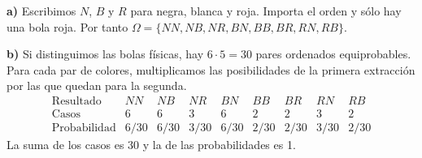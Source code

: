 \textbf{a)} Escribimos $N$, $B$ y $R$ para negra, blanca y roja.
Importa el orden y sólo hay una bola roja. Por tanto
$\Omega=\{NN,NB,NR,BN,BB,BR,RN,RB\}$.

\textbf{b)} Si distinguimos las bolas físicas, hay $6\cdot5=30$
pares ordenados equiprobables. Para cada par de colores,
multiplicamos las posibilidades de la primera extracción por
las que quedan para la segunda.
\[
\begin{array}{c|rrrrrrrr}
\text{Resultado}&NN&NB&NR&BN&BB&BR&RN&RB\\\hline
\text{Casos}&6&6&3&6&2&2&3&2\\
\text{Probabilidad}&6/30&6/30&3/30&6/30&2/30&2/30&3/30&2/30
\end{array}
\]
La suma de los casos es 30 y la de las probabilidades es 1.
